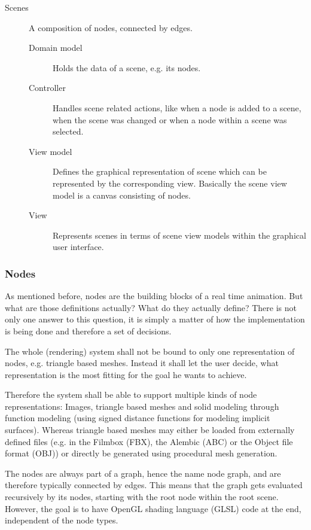 \documentclass[
    a4paper,      %
    10pt,         %
    openright,    %
    notitlepage,  %
    parskip=half, %
]{scrreprt}       %
\theoremstyle{definition}                    %
\begin{document}
\begin{description}
\item[Scenes] A composition of nodes, connected by edges.
  \begin{description}
    \item[Domain model] Holds the data of a scene, e.g. its nodes.
    \item[Controller]   Handles scene related actions, like when a node is added
                        to a scene, when the scene was changed or when a node
                        within a scene was selected.
    \item[View model]   Defines the graphical representation of scene which can
                        be represented by the corresponding view. Basically the
                        scene view model is a canvas consisting of nodes.
    \item[View]         Represents scenes in terms of scene view models within the
                        graphical user interface.
  \end{description}
\end{description}

\subsubsection{Nodes}
\label{ssubsec:nodes}

As mentioned before, nodes are the building blocks of a real time animation. But
what are those definitions actually? What do they actually define? There is not
only one answer to this question, it is simply a matter of how the
implementation is being done and therefore a set of decisions.

The whole (rendering) system shall not be bound to only one representation of
nodes, e.g. triangle based meshes. Instead it shall let the user decide, what
representation is the most fitting for the goal he wants to achieve.

Therefore the system shall be able to support multiple kinds of node
representations: Images, triangle based meshes and solid modeling through
function modeling (using signed distance functions for modeling implicit
surfaces). Whereas triangle based meshes may either be loaded from externally
defined files (e.g. in the Filmbox (FBX), the Alembic (ABC) or the Object file
format (OBJ)) or directly be generated using procedural mesh generation.

The nodes are always part of a graph, hence the name node graph, and are
therefore typically connected by edges. This means that the graph gets evaluated
recursively by its nodes, starting with the root node within the root scene.
However, the goal is to have OpenGL shading language (GLSL) code at the end, independent of the node types.
\end{document}
